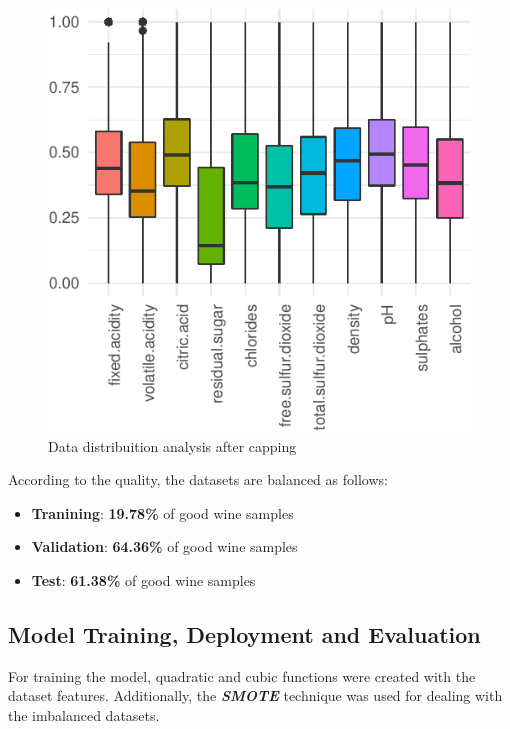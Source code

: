\documentclass[a4paperpaper,9pt,twocolumn,twoside,printwatermark=false]{pinp}
\providecommand{\tightlist}{%
  \setlength{\itemsep}{0pt}\setlength{\parskip}{0pt}}
\begin{document}
\begin{figure}

{\centering \includegraphics{WineQualityAnalysis_files/figure-latex/DistributionAnalysis2-1} 

}

\caption{Data distribuition analysis after capping}\label{fig:DistributionAnalysis2}
\end{figure}

According to the quality, the datasets are balanced as follows:

\begin{itemize}
\tightlist
\item
  \textbf{Tranining}: \textbf{19.78\%} of good wine samples
\item
  \textbf{Validation}: \textbf{64.36\%} of good wine samples
\item
  \textbf{Test}: \textbf{61.38\%} of good wine samples
\end{itemize}

\subsection{Model Training, Deployment and
Evaluation}\label{model-training-deployment-and-evaluation}

For training the model, quadratic and cubic functions were created with
the dataset features. Additionally, the \textbf{\emph{SMOTE}} technique
was used for dealing with the imbalanced datasets.
\end{document}
